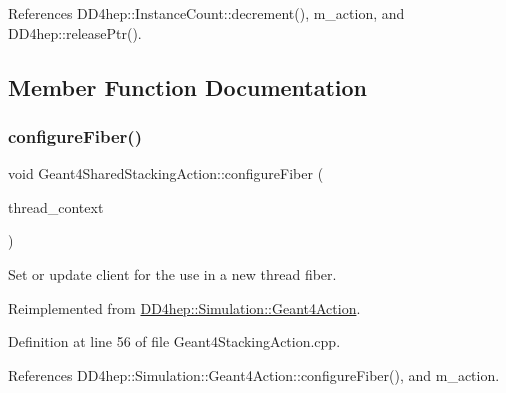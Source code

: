 References D\+D4hep\+::\+Instance\+Count\+::decrement(), m\+\_\+action, and D\+D4hep\+::release\+Ptr().



\subsection{Member Function Documentation}
\hypertarget{class_d_d4hep_1_1_simulation_1_1_geant4_shared_stacking_action_af204c8b8ed06b5ac14c168ea639c51ac}{}\label{class_d_d4hep_1_1_simulation_1_1_geant4_shared_stacking_action_af204c8b8ed06b5ac14c168ea639c51ac} 
\subsubsection{\texorpdfstring{configure\+Fiber()}{configureFiber()}}
{\footnotesize\ttfamily void Geant4\+Shared\+Stacking\+Action\+::configure\+Fiber (\begin{DoxyParamCaption}\item[{\hyperlink{class_d_d4hep_1_1_simulation_1_1_geant4_context}{Geant4\+Context} $\ast$}]{thread\+\_\+context }\end{DoxyParamCaption})\hspace{0.3cm}{\ttfamily [virtual]}}



Set or update client for the use in a new thread fiber. 



Reimplemented from \hyperlink{class_d_d4hep_1_1_simulation_1_1_geant4_action_a6adc7138508303e4e417cb48a737ab19}{D\+D4hep\+::\+Simulation\+::\+Geant4\+Action}.



Definition at line 56 of file Geant4\+Stacking\+Action.\+cpp.



References D\+D4hep\+::\+Simulation\+::\+Geant4\+Action\+::configure\+Fiber(), and m\+\_\+action.

\hypertarget{class_d_d4hep_1_1_simulation_1_1_geant4_shared_stacking_action_af92666552c404908a7e99c8145846c5f}{}\label{class_d_d4hep_1_1_simulation_1_1_geant4_shared_stacking_action_af92666552c404908a7e99c8145846c5f} 
